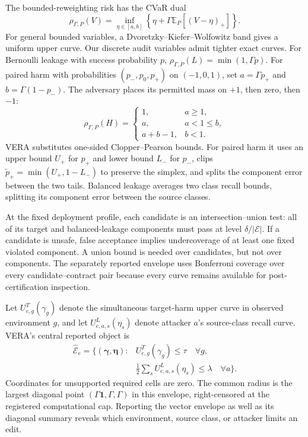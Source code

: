 The bounded-reweighting risk has the CVaR dual
\begin{equation}
\rho_{\Gamma,P}(V)=\inf_{\eta\in[a,b]}
\left\{\eta+\Gamma\mathbb E_P[(V-\eta)_+]\right\}.
\end{equation}
For general bounded variables, a Dvoretzky--Kiefer--Wolfowitz band gives a
uniform upper curve. Our discrete audit variables admit tighter exact curves.
For Bernoulli leakage with success probability $p$,
$\rho_{\Gamma,P}(L)=\min(1,\Gamma p)$. For paired harm with probabilities
$(p_-,p_0,p_+)$ on $(-1,0,1)$, set $a=\Gamma p_+$ and
$b=\Gamma(1-p_-)$. The adversary places its permitted mass on $+1$, then
zero, then $-1$:
\begin{equation}
\rho_{\Gamma,P}(H)=
\begin{cases}
1,&a\ge1,\\
a,&a<1\le b,\\
a+b-1,&b<1.
\end{cases}
\end{equation}
VERA substitutes one-sided Clopper--Pearson bounds. For paired harm it uses an upper bound
$U_+$ for $p_+$ and lower bound $L_-$ for $p_-$, clips
$\widetilde p_+=\min(U_+,1-L_-)$ to preserve the simplex, and splits the
component error between the two tails. Balanced leakage averages two class
recall bounds, splitting its component error between the source classes.

At the fixed deployment profile, each candidate is an intersection--union
test: all of its target and balanced-leakage components must pass at level
$\delta/|\mathcal E|$. If a candidate is unsafe, false acceptance implies
undercoverage of at least one fixed violated component. A union bound is needed
over candidates, but not over components. The separately reported envelope
uses Bonferroni coverage over every candidate--contract pair because every
curve remains available for post-certification inspection.

Let $U^T_{e,g}(\gamma_g)$ denote the simultaneous target-harm upper curve in
observed environment $g$, and let $U^L_{e,a,s}(\eta_s)$ denote attacker $a$'s
source-class recall curve. VERA's central reported object is
\begin{equation}
\begin{split}
\widehat{\mathcal E}_e=\{(\boldsymbol\gamma,\boldsymbol\eta):
&U^T_{e,g}(\gamma_g)\le\tau\quad\forall g,\\
&\tfrac12\textstyle\sum_s U^L_{e,a,s}(\eta_s)\le\lambda
\quad\forall a\}.
\end{split}
\end{equation}
Coordinates for unsupported required cells are zero. The common radius is the
largest diagonal point $(\Gamma\mathbf 1,\Gamma,\Gamma)$ in this envelope,
right-censored at the registered computational cap. Reporting the vector
envelope as well as its diagonal summary reveals which environment, source
class, or attacker limits an edit.

